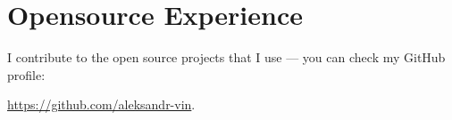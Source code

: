 \section*{Opensource Experience}

I contribute to the open source projects that I use --- you can check my GitHub profile:

\href{https://github.com/aleksandr-vin}{\url{https://github.com/aleksandr-vin}}.
